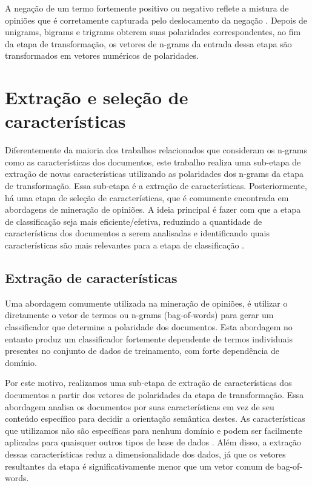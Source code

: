 A negação de um termo fortemente positivo ou negativo reflete a mistura de opiniões que é corretamente capturada pelo deslocamento da negação \cite{taboada2011lexicon}. Depois de unigrams, bigrams e trigrams obterem suas polaridades correspondentes, ao fim da etapa de transformação, os vetores de n-grams da entrada dessa etapa são transformados em vetores numéricos de polaridades.  

\section{Extração e seleção de características}

Diferentemente da maioria dos trabalhos relacionados que consideram os n-grams como as características dos documentos, este trabalho realiza uma sub-etapa de extração de novas características utilizando as polaridades dos n-grams da etapa de transformação. Essa sub-etapa é a extração de características. Posteriormente, há uma etapa de seleção de características, que é comumente encontrada em abordagens de mineração de opiniões. A ideia principal é fazer com que a etapa de classificação seja mais eficiente/efetiva, reduzindo a quantidade de características dos documentos a serem analisadas e identificando quais características são mais relevantes para a etapa de classificação \cite{moraes2012document}. 

\subsection{Extração de características}

Uma abordagem comumente utilizada na mineração de opiniões, é utilizar o diretamente o vetor de termos ou n-grams (bag-of-words) para gerar um classificador que determine a polaridade dos documentos. Esta abordagem no entanto produz um classificador fortemente dependente de termos individuais presentes no conjunto de dados de treinamento, com forte dependência de domínio. 

Por este motivo, realizamos uma sub-etapa de extração de características dos documentos a partir dos vetores de polaridades da etapa de transformação. Essa abordagem  analisa os documentos por suas características em vez de seu conteúdo específico para decidir a orientação semântica  destes. As características que utilizamos não são específicas para nenhum domínio e podem ser facilmente aplicadas para quaisquer outros tipos de base de dados \cite{pang2002thumbs}. Além disso, a extração dessas características reduz a dimensionalidade dos dados, já que os vetores resultantes da etapa é significativamente menor que um vetor comum de bag-of-words.

